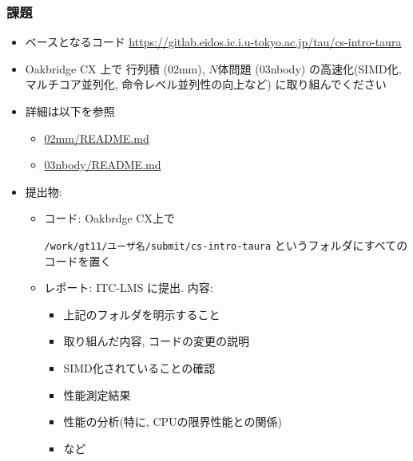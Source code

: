 \documentclass[10pt,dvipdfmx]{beamer}
\newcommand{\ao}[1]{{\color{blue}#1}}
\begin{document}
\begin{frame}[fragile]
  \frametitle{課題}
  \begin{itemize}
  \item ベースとなるコード
    {\footnotesize \url{https://gitlab.eidos.ic.i.u-tokyo.ac.jp/tau/cs-intro-taura}}
  \item Oakbridge CX 上で 行列積 (02mm), $N$体問題 (03nbody) の高速化(SIMD化, マルチコア並列化, 命令レベル並列性の向上など)
    に取り組んでください
  \item 詳細は以下を参照
    \begin{itemize}
    \item \href{https://gitlab.eidos.ic.i.u-tokyo.ac.jp/tau/cs-intro-taura/-/tree/master/02mm}{02mm/README.md}
    \item \href{https://gitlab.eidos.ic.i.u-tokyo.ac.jp/tau/cs-intro-taura/-/tree/master/03nbody}{03nbody/README.md}
    \end{itemize}
  \item 提出物:
    \begin{itemize}
    \item コード: Oakbrdge CX上で
      
      \ao{\tt /work/gt11/ユーザ名/submit/cs-intro-taura}
      というフォルダにすべてのコードを置く
    \item レポート: ITC-LMS に提出.
      内容:
      \begin{itemize}
      \item 上記のフォルダを明示すること
      \item 取り組んだ内容, コードの変更の説明
      \item SIMD化されていることの確認
      \item 性能測定結果
      \item 性能の分析(特に, CPUの限界性能との関係)
      \item など
      \end{itemize}
    \end{itemize}
  \end{itemize}
\end{frame}
\end{document}
